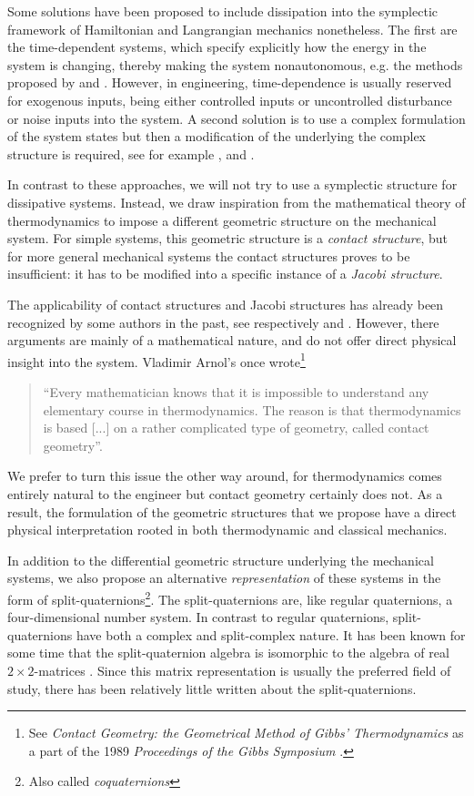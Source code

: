 Some solutions have been proposed to include dissipation into the symplectic framework of Hamiltonian and Langrangian mechanics nonetheless. The first are the time-dependent systems, which specify explicitly how the energy in the system is changing, thereby making the system nonautonomous, e.g. the methods proposed by \citet{Caldirola1941} and \citet{Kanai1948}. However, in engineering, time-dependence is usually reserved for exogenous inputs, being either controlled inputs or uncontrolled disturbance or noise inputs into the system. A second solution is to use a complex formulation of the system states but then a modification of the underlying the complex structure is required, see for example \citet{Hutters2020}, \citet{Dedene1980} and \citet{Rajeev2007}.

In contrast to these approaches, we will not try to use a symplectic structure for dissipative systems. Instead, we draw inspiration from the mathematical theory of thermodynamics to impose a different geometric structure on the mechanical system. For simple systems, this geometric structure is a \emph{contact structure}, but for more general mechanical systems the contact structures proves to be insufficient: it has to be modified into a specific instance of a \emph{Jacobi structure}.

The applicability of contact structures and Jacobi structures has already been recognized by some authors in the past, see respectively \citet{Bravetti2017} and \citet{ciaglia2018}. However, there arguments are mainly of a mathematical nature, and do not offer direct physical insight into the system. Vladimir Arnol's once wrote\footnote{See \emph{Contact Geometry: the Geometrical Method of Gibbs' Thermodynamics} as a part of the 1989 \emph{Proceedings of the Gibbs Symposium} \cite[p. 163]{Arnold1989b}.}
\begin{quote}
``Every mathematician knows that it is impossible to understand any elementary course in thermodynamics. The reason is that thermodynamics is based [...] on a rather complicated type of geometry, called contact geometry''.
\end{quote}
We prefer to turn this issue the other way around, for thermodynamics comes entirely natural to the engineer but contact geometry certainly does not. As a result, the formulation of the geometric structures that we propose have a direct physical interpretation rooted in both thermodynamic and classical mechanics.

In addition to the differential geometric structure underlying the mechanical systems, we also propose an alternative \emph{representation} of these systems in the form of split-quaternions\footnote{Also called \emph{coquaternions}}. The split-quaternions are, like regular quaternions, a four-dimensional number system. In contrast to regular quaternions, split-quaternions have both a complex and split-complex nature. It has been known for some time that the split-quaternion algebra is isomorphic to the algebra of real $2\times2$-matrices \cite{Jafari2014}. Since this matrix representation is usually the preferred field of study, there has been relatively little written about the split-quaternions. 

